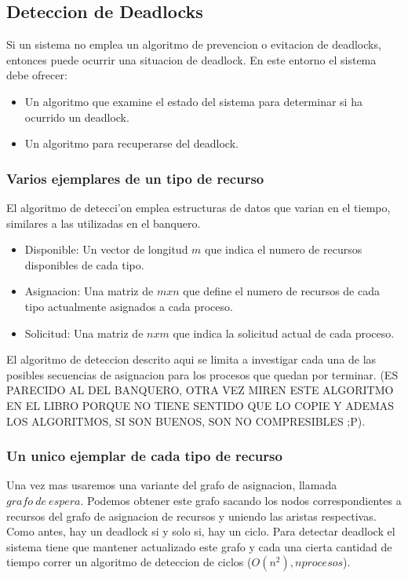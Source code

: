\documentclass[a4paper,10pt]{article}
\begin{document}
\subsection{Deteccion de Deadlocks}
Si un sistema no emplea un algoritmo de prevencion o evitacion de deadlocks, entonces puede ocurrir una situacion de deadlock. En este entorno el sistema debe ofrecer:
\begin{itemize}
 \item Un algoritmo que examine el estado del sistema para determinar si ha ocurrido un deadlock.
 \item Un algoritmo para recuperarse del deadlock.
\end{itemize}

\subsubsection{Varios ejemplares de un tipo de recurso}
El algoritmo de detecci'on emplea estructuras de datos que varian en el tiempo, similares a las utilizadas en el banquero.

\begin{itemize}
 \item Disponible: Un vector de longitud $m$ que indica el numero de recursos disponibles de cada tipo.
 \item Asignacion: Una matriz de $mxn$ que define el numero de recursos de cada tipo actualmente asignados a cada proceso.
 \item Solicitud: Una matriz de $nxm$ que indica la solicitud actual de cada proceso.
\end{itemize}
El algoritmo de deteccion descrito aqui se limita a investigar cada una de las posibles secuencias de asignacion para los procesos que quedan por terminar. (ES PARECIDO AL DEL BANQUERO, OTRA VEZ MIREN ESTE ALGORITMO EN EL LIBRO PORQUE NO TIENE SENTIDO QUE LO COPIE Y ADEMAS LOS ALGORITMOS, SI SON BUENOS, SON NO COMPRESIBLES ;P).

\subsubsection{Un unico ejemplar de cada tipo de recurso}
Una vez mas usaremos una variante del grafo de asignacion, llamada $grafo\ de\ espera$. Podemos obtener este grafo sacando los nodos correspondientes a recursos del grafo de asignacion de recursos y uniendo las aristas respectivas.
Como antes, hay un deadlock si y solo si, hay un ciclo. Para detectar deadlock el sistema tiene que mantener actualizado este grafo y cada una cierta cantidad de tiempo correr un algoritmo de deteccion de ciclos ($O(n^{2}), n procesos$).
\end{document}
